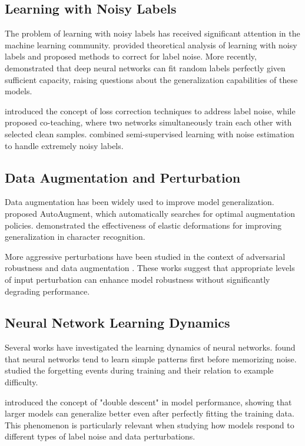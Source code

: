 \documentclass[10pt,twocolumn,letterpaper]{article}
\begin{document}
\subsection{Learning with Noisy Labels}
The problem of learning with noisy labels has received significant attention in the machine learning community.
\cite{natarajan2013learning} provided theoretical analysis of learning with noisy labels and proposed methods to correct for label noise.
More recently, \cite{zhang2021understanding} demonstrated that deep neural networks can fit random labels perfectly given sufficient capacity, raising questions about the generalization capabilities of these models.

\cite{patrini2017making} introduced the concept of loss correction techniques to address label noise, while \cite{han2018co} proposed co-teaching, where two networks simultaneously train each other with selected clean samples.
\cite{li2020dividemix} combined semi-supervised learning with noise estimation to handle extremely noisy labels.

\subsection{Data Augmentation and Perturbation}
Data augmentation has been widely used to improve model generalization.
\cite{cubuk2019autoaugment} proposed AutoAugment, which automatically searches for optimal augmentation policies.
\cite{simard2003best} demonstrated the effectiveness of elastic deformations for improving generalization in character recognition.

More aggressive perturbations have been studied in the context of adversarial robustness \cite{goodfellow2014explaining} and data augmentation \cite{hendrycks2019augmix}.
These works suggest that appropriate levels of input perturbation can enhance model robustness without significantly degrading performance.

\subsection{Neural Network Learning Dynamics}
Several works have investigated the learning dynamics of neural networks.
\cite{arpit2017closer} found that neural networks tend to learn simple patterns first before memorizing noise.
\cite{toneva2018empirical} studied the forgetting events during training and their relation to example difficulty.

\cite{nakkiran2019deep} introduced the concept of "double descent" in model performance, showing that larger models can generalize better even after perfectly fitting the training data.
This phenomenon is particularly relevant when studying how models respond to different types of label noise and data perturbations.
\end{document}
